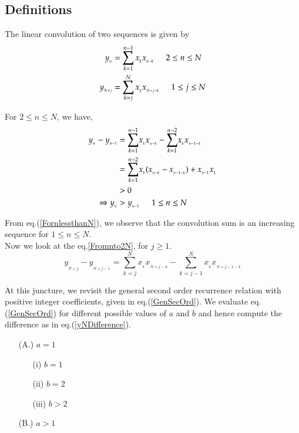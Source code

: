 \begin{multicols}{2}
\subsection{Definitions}\label{subsection-15.2}
The linear convolution of two sequences is given by
\begin{align}
y_{_n} &= \displaystyle{\sum_{k=1}^{n-1}x_{_k} x_{_{n-k}}} \hspace{0.2in} 2 \leq n\leq N\label{eq-15.6}\\
y_{_{N+j}} &= \displaystyle{\sum_{k=j}^{N}x_{_k} x_{_{N+j-k}}} \hspace{0.2in} 1 \leq j \leq N\label{eq-15.7}
\end{align}

For $2\leq n \leq N$, we have,
\begin{align}
y_{_n} - y_{_{n-1}} &= \displaystyle{\sum_{k=1}^{n-1}}x_{_k}x_{_{n-k}} -  \displaystyle{\sum_{k=1}^{n-2}}x_{_k}x_{_{n-1-k}}\label{eq-15.8}\\
&= \displaystyle{\sum_{k=1}^{n-2}}x_{_k} (x_{_{n-k}}-x_{_{n-1-k}} )+ x_{_{n-1}}x_{_1}\label{eq-15.9}\\
& >  0 \nonumber\\
\Rightarrow y_{_n} &> y_{_{n-1}} \hspace{0.2in} 1\leq n \leq N\label{eq-15.10}
\end{align}

From eq.(\ref{FornlessthanN}), we observe that the convolution sum is an increasing sequence for $1\leq n\leq N$.\\
Now we look at the eq.\ref{Fromnto2N}, for $j\geq 1$. 
\begin{equation}
y_{_{N+j}} - y_{_{N+j-1}} = \displaystyle{\sum_{k=j}^{N}}x_{_{k}}x_{_{N+j-k}} -  \displaystyle{\sum_{k=j-1}^{N}}x_{_k}x_{_{N+j-1-k}}\label{eq-15.11}
\end{equation}

\vspace{-.3cm}

At this juncture, we revisit the general second order recurrence relation with positive integer coefficients, given in eq.(\ref{GenSecOrd}). We evaluate eq.(\ref{GenSecOrd}) for different possible values of $a$ and $b$ and hence compute the difference as in eq.(\ref{yNDifference}).

\vspace{-.3cm}

\begin{itemize}
\item [(A.)] $a = 1$
	\begin{itemize}
	\item [(i)]  $b = 1$
	\item [(ii)] $b = 2$
	\item [(iii)]$b > 2$
	\end{itemize}
\item [(B.)] $a >1$
\end{itemize}


\end{multicols}
